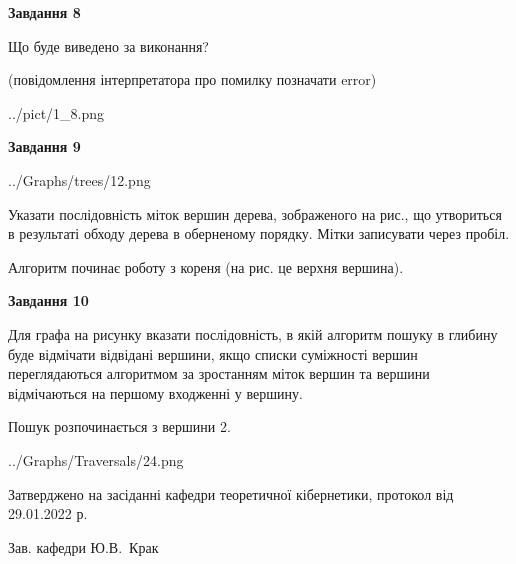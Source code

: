 \documentclass[12pt, ukrainian]{article}
\begin{document}
{\begin {large}
{\begin {center}\textbf{Завдання 8}\end {center}}\par
Що буде виведено за виконання?\par
 (повідомлення інтерпретатора про помилку позначати error)\par
\begin{center}
	{../pict/1_8.png}
\end{center}
\newpage

{\begin {center}\textbf{Завдання 9}\end {center}}\par

\begin{center}
	{../Graphs/trees/12.png}
\end{center}
Указати послідовність міток вершин дерева, зображеного на рис., що утвориться в результаті обходу дерева в оберненому порядку. Мітки записувати через пробіл.\par Алгоритм починає роботу з кореня (на рис. це верхня вершина).\par
\newpage

{\begin {center}\textbf{Завдання 10}\end {center}}\par
Для графа на рисунку вказати послідовність, в якій алгоритм пошуку в глибину буде відмічати відвідані вершини, якщо списки суміжності вершин переглядаються алгоритмом за зростанням міток вершин та вершини відмічаються на першому вход\-женні у вершину.\par
Пошук розпочинається з вершини 2.\par

\begin{center}
	{../Graphs/Traversals/24.png}
\end{center}\par
\newpage


\end {large}
}
{\smallskip \begin {small} Затверджено на засіданні кафедри теоретичної кібернетики, протокол  від   29.01.2022 р.\par\smallskip\smallskip
{\parbox {6.5 cm}{Зав. кафедри \dotfill Ю.В.~Крак}} \end{small}}
\end{document}
